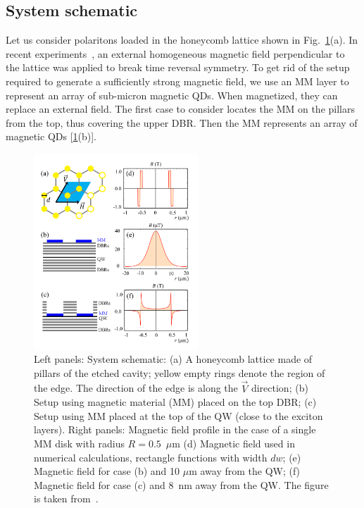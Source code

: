 \subsection{System schematic}
Let us consider polaritons loaded in the honeycomb lattice shown in Fig.~\ref{fig:Ch5_Fig1}(a).
In recent experiments~\cite{Klembt:2018aa}, an external homogeneous magnetic field perpendicular to the lattice was applied to break time reversal symmetry.
To get rid of the setup required to generate a sufficiently strong magnetic field, we use an MM layer to represent an array of sub-micron magnetic QDs. When magnetized, they can replace an external field.
%
The first case to consider locates the MM on the pillars from the top, thus covering the upper DBR.
Then the MM represents an array of magnetic QDs [\ref{fig:Ch5_Fig1}(b)].
%
%
%
\begin{figure}[ht]
    \centering
	\includegraphics[width=0.55\textwidth]{Fig/Ch5/Fig1.pdf}
	\caption[TI system and magnetic field]{Left panels: System schematic: (a) A honeycomb lattice made of pillars of the etched cavity; yellow empty rings denote the region of the edge. The direction of the edge is along the $\vec{V}$ direction;
	(b) Setup using magnetic material (MM) placed on the top DBR;
	(c) Setup using MM placed at the top of the QW (close to the exciton layers).
	Right panels: Magnetic field profile in the case of a single MM disk with radius $R = 0.5$~$\mu$m  (d) Magnetic field used in numerical calculations, rectangle functions with width $dw$; (e) Magnetic field for case (b) and 10 $\mu$m away from the QW; (f) Magnetic field for case (c) and 8~nm away from the QW. The figure is taken from~\cite{Sun:2019ab}.}
\label{fig:Ch5_Fig1}
\end{figure}
%
%
%


